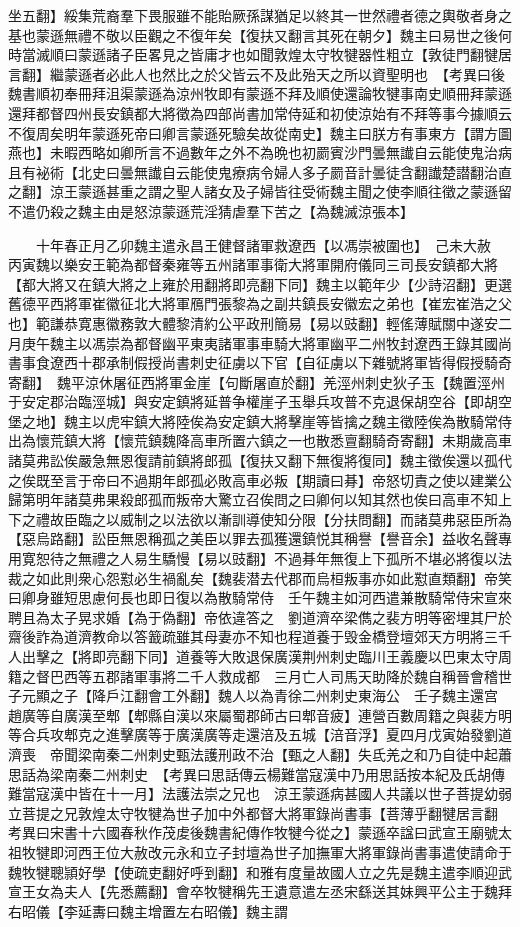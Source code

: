 坐五翻】綏集荒裔羣下畏服雖不能貽厥孫謀猶足以終其一世然禮者德之輿敬者身之基也蒙遜無禮不敬以臣觀之不復年矣【復扶又翻言其死在朝夕】魏主曰易世之後何時當滅順曰蒙遜諸子臣畧見之皆庸才也如聞敦煌太守牧犍器性粗立【敦徒門翻犍居言翻】繼蒙遜者必此人也然比之於父皆云不及此殆天之所以資聖明也　【考異曰後魏書順初奉冊拜沮渠蒙遜為涼州牧即有蒙遜不拜及順使還論牧犍事南史順冊拜蒙遜還拜都督四州長安鎮都大將徵為四部尚書加常侍延和初使涼始有不拜等事今據順云不復周矣明年蒙遜死帝曰卿言蒙遜死驗矣故從南史】魏主曰朕方有事東方【謂方圖燕也】未暇西略如卿所言不過數年之外不為晩也初罽賓沙門曇無䜟自云能使鬼治病且有袐術【北史曰曇無䜟自云能使鬼療病令婦人多子罽音計曇徒含翻䜟楚譛翻治直之翻】涼王蒙遜甚重之謂之聖人諸女及子婦皆往受術魏主聞之使李順往徵之蒙遜留不遣仍殺之魏主由是怒涼蒙遜荒淫猜虐羣下苦之【為魏滅涼張本】

　　十年春正月乙卯魏主遣永昌王健督諸軍救遼西【以馮崇被圍也】　己未大赦　丙寅魏以樂安王範為都督秦雍等五州諸軍事衛大將軍開府儀同三司長安鎮都大將【都大將又在鎮大將之上雍於用翻將即亮翻下同】魏主以範年少【少詩沼翻】更選舊德平西將軍崔徽征北大將軍鴈門張黎為之副共鎮長安徽宏之弟也【崔宏崔浩之父也】範謙恭寛惠徽務敦大體黎清約公平政刑簡易【易以豉翻】輕傜薄賦關中遂安二月庚午魏主以馮崇為都督幽平東夷諸軍事車騎大將軍幽平二州牧封遼西王錄其國尚書事食遼西十郡承制假授尚書刺史征虜以下官【自征虜以下雜號將軍皆得假授騎奇寄翻】　魏平涼休屠征西將軍金崖【句斷屠直於翻】羌涇州刺史狄子玉【魏置涇州于安定郡治臨涇城】與安定鎮將延普争權崖子玉舉兵攻普不克退保胡空谷【即胡空堡之地】魏主以虎牢鎮大將陸俟為安定鎮大將擊崖等皆擒之魏主徵陸俟為散騎常侍出為懷荒鎮大將【懷荒鎮魏降高車所置六鎮之一也散悉亶翻騎奇寄翻】未期歲高車諸莫弗訟俟嚴急無恩復請前鎮將郎孤【復扶又翻下無復將復同】魏主徵俟還以孤代之俟既至言于帝曰不過期年郎孤必敗高車必叛【期讀曰朞】帝怒切責之使以建業公歸第明年諸莫弗果殺郎孤而叛帝大驚立召俟問之曰卿何以知其然也俟曰高車不知上下之禮故臣臨之以威制之以法欲以漸訓導使知分限【分扶問翻】而諸莫弗惡臣所為【惡烏路翻】訟臣無恩稱孤之美臣以罪去孤獲還鎮悦其稱譽【譽音余】益收名聲專用寛恕待之無禮之人易生驕慢【易以豉翻】不過朞年無復上下孤所不堪必將復以法裁之如此則衆心怨懟必生禍亂矣【魏裴潜去代郡而烏桓叛事亦如此懟直類翻】帝笑曰卿身雖短思慮何長也即日復以為散騎常侍　壬午魏主如河西遣兼散騎常侍宋宣來聘且為太子晃求婚【為于偽翻】帝依違答之　劉道濟卒梁儁之裴方明等密埋其尸於齋後詐為道濟教命以答籖疏雖其母妻亦不知也程道養于毁金橋登壇郊天方明將三千人出擊之【將即亮翻下同】道養等大敗退保廣漢荆州刺史臨川王義慶以巴東太守周籍之督巴西等五郡諸軍事將二千人救成都　三月亡人司馬天助降於魏自稱晉會稽世子元顯之子【降戶江翻會工外翻】魏人以為青徐二州刺史東海公　壬子魏主還宫　趙廣等自廣漢至郫【郫縣自漢以來屬蜀郡師古曰郫音疲】連營百數周籍之與裴方明等合兵攻郫克之進擊廣等于廣漢廣等走還涪及五城【涪音浮】夏四月戊寅始發劉道濟喪　帝聞梁南秦二州刺史甄法護刑政不治【甄之人翻】失氐羌之和乃自徒中起蕭思話為梁南秦二州刺史　【考異曰思話傳云楊難當寇漢中乃用思話按本紀及氏胡傳難當寇漢中皆在十一月】法護法崇之兄也　涼王蒙遜病甚國人共議以世子菩提幼弱立菩提之兄敦煌太守牧犍為世子加中外都督大將軍錄尚書事【菩薄乎翻犍居言翻　考異曰宋書十六國春秋作茂䖍後魏書紀傳作牧犍今從之】蒙遜卒諡曰武宣王廟號太祖牧犍即河西王位大赦改元永和立子封壇為世子加撫軍大將軍錄尚書事遣使請命于魏牧犍聰頴好學【使疏吏翻好呼到翻】和雅有度量故國人立之先是魏主遣李順迎武宣王女為夫人【先悉薦翻】會卒牧犍稱先王遺意遣左丞宋繇送其妹興平公主于魏拜右昭儀【李延夀曰魏主增置左右昭儀】魏主謂